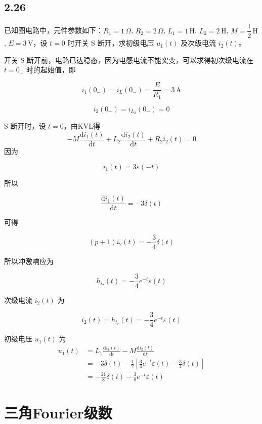 \documentclass[UTF8]{ctexart}
\begin{document}
\subsection{2.26}

\begin{problem}
已知图电路中，元件参数如下：$R_1 = 1\,\Omega$, $R_2 = 2\,\Omega$, $L_1 = 1\,\mathrm{H}$, $L_2 = 2\,\mathrm{H}$, $M = \dfrac{1}{2}\,\mathrm{H}$, $E = 3\,\mathrm{V}$，设 $t = 0$ 时开关 S 断开，求初级电压 $u_1(t)$ 及次级电流 $i_2(t)$。
\end{problem}

\begin{solution}
开关 S 断开前，电路已达稳态，因为电感电流不能突变，可以求得初次级电流在 $t = 0_-$ 时的起始值，即

$$
i_1(0_-) = i_L(0_-) = \frac{E}{R_1} = 3\,\mathrm{A}
$$

$$
i_2(0_-) = i_{L_2}(0_-) = 0
$$

S 断开时，设 $t = 0$，由KVL得
$$
-M\frac{\mathrm{d}i_1(t)}{\mathrm{d}t} + L_2\frac{\mathrm{d}i_2(t)}{\mathrm{d}t} + R_2 i_2(t) = 0
$$
因为

$$
i_1(t) = 3\varepsilon(-t)
$$

所以

$$
\frac{\mathrm{d}i_1(t)}{\mathrm{d}t} = -3\delta(t)
$$

可得

$$
(p+1)i_2(t) = -\frac{3}{4}\delta(t)
$$

所以冲激响应为

$$
h_{i_2}(t) = -\frac{3}{4}e^{-t}\varepsilon(t)
$$

次级电流 $i_2(t)$ 为

$$
i_2(t) = h_{i_2}(t) = -\frac{3}{4}e^{-t}\varepsilon(t)
$$

初级电压 $u_1(t)$ 为
$$
\begin{aligned}
u_1(t) &= L_1\frac{\mathrm{d}i_1(t)}{\mathrm{d}t} - M\frac{\mathrm{d}i_2(t)}{\mathrm{d}t} \\
&= -3\delta(t) - \frac{1}{2}\left[\frac{3}{4}e^{-t}\varepsilon(t) - \frac{3}{4}\delta(t)\right] \\
&= -\frac{21}{8}\delta(t) - \frac{3}{8}e^{-t}\varepsilon(t)
\end{aligned}
$$
\end{solution}

\section{三角Fourier级数}
\end{document}
